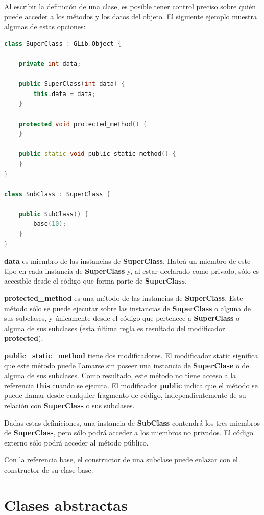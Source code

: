 \documentclass[12pt,twoside]{book}
\begin{document}
Al escribir la definición de una clase, es posible tener control preciso sobre quién puede acceder a los métodos y los datos del objeto. El siguiente ejemplo muestra algunas de estas opciones:

\begin{lstlisting}[language=C++]
class SuperClass : GLib.Object {
	
	private int data;
	
	public SuperClass(int data) {
		this.data = data;
	}
	
	protected void protected_method() {
	}
	
	public static void public_static_method() {
	}
}

class SubClass : SuperClass {
	
	public SubClass() {
		base(10);
	}
}
\end{lstlisting}

\textbf{data} es miembro de las instancias de \textbf{SuperClass}. Habrá un miembro de este tipo en cada instancia de \textbf{SuperClass} y, al estar declarado como privado, sólo es accesible desde el código que forma parte de \textbf{SuperClass}.

\textbf{protected\_method} es una método de las instancias de \textbf{SuperClass}. Este método sólo se puede ejecutar sobre las instancias de \textbf{SuperClass} o alguna de sus subclases, y únicamente desde el código que pertenece a \textbf{SuperClass} o alguna de sus subclases (esta última regla es resultado del modificador \textbf{protected}).

\textbf{public\_static\_method} tiene dos modificadores. El modificador static significa que este método puede llamarse sin poseer una instancia de \textbf{SuperClase} o de alguna de sus subclases. Como resultado, este método no tiene acceso a la referencia \textbf{this} cuando se ejecuta. El modificador \textbf{public} indica que el método se puede llamar desde cualquier fragmento de código, independientemente de su relación con \textbf{SuperClass} o sus subclases.

Dadas estas definiciones, una instancia de \textbf{SubClass} contendrá los tres miembros de \textbf{SuperClass}, pero sólo podrá acceder a los miembros no privados. El código externo sólo podrá acceder al método público.

Con la referencia base, el constructor de una subclase puede enlazar con el constructor de su clase base.


\section{Clases abstractas}
\end{document}
